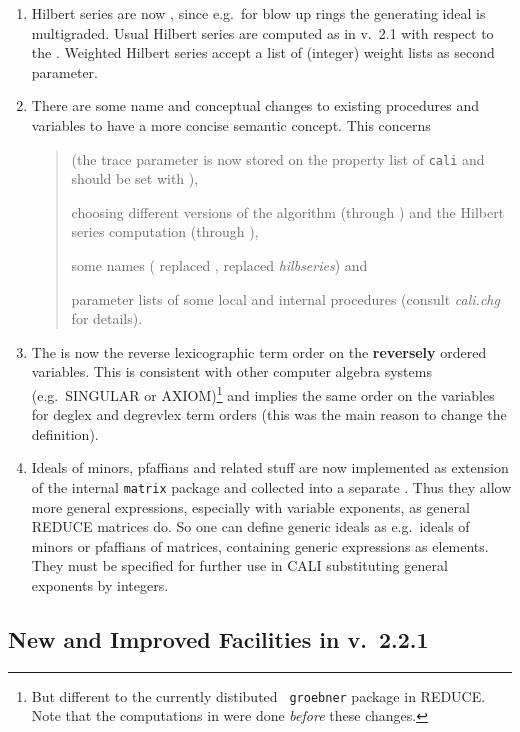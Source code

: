 \begin{enumerate}
\item Hilbert series are now , since
e.g.\ for blow up rings the generating ideal is multigraded. Usual
Hilbert series are computed as in v.\ 2.1 with respect to the
. Weighted Hilbert series accept a list of (integer)
weight lists as second parameter.

\item There are some name and conceptual changes to existing
procedures and variables to have a more concise semantic concept. This
concerns 
\begin{quote}
 (the trace parameter is now stored on the property list
of {\tt cali} and should be set with ), 

choosing different versions of the \gr algorithm (through
) and the Hilbert series computation (through
), 

some names ( replaced , 
replaced {\em hilbseries}) and

parameter lists of some local and internal procedures (consult {\em
cali.chg} for details).
\end{quote}

\item The  is now the reverse lexicographic
term order on the {\bf reversely} ordered variables. This is consistent
with other computer algebra systems (e.g.\ SINGULAR or
AXIOM)\footnote{But different to the currently distibuted {\tt 
groebner} package in REDUCE. Note that the computations in
\cite{fgb} were done {\em before} these changes.} and implies the same
order on the variables for deglex and degrevlex term orders (this was
the main reason to change the definition).  

\item Ideals of minors, pfaffians and related stuff are now
implemented as extension of the internal {\tt matrix} package and
collected into a separate . Thus they allow more
general expressions, especially with variable exponents, as general
REDUCE matrices do. So one can define generic ideals as e.g.\ ideals
of minors or pfaffians of matrices, containing generic expressions as
elements. They must be specified for further use in CALI substituting
general exponents by integers. 

\end{enumerate}

\subsection{New and Improved Facilities in v.\ 2.2.1\label{221}}

